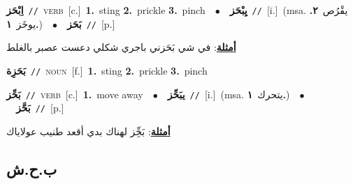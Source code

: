\documentclass[10pt,a4paper,twoside]{article} %
\begin{document}
\begin{multicols}{2}
{{{{{{{{{{{\setlength\topsep{0pt}\textbf{\foreignlanguage{arabic}{اِبْحَز}}\ {\color{gray}\texttt{//}\color{black}}\ \textsc{verb}\ [c.]\ \textbf{1.}~sting  \textbf{2.}~prickle  \textbf{3.}~pinch\ \ $\bullet$\ \ \setlength\topsep{0pt}\textbf{\foreignlanguage{arabic}{يِبْحَز}}\ {\color{gray}\texttt{//}\color{black}}\ [i.]\ \color{gray}(msa. \foreignlanguage{arabic}{يقْرُص}~\foreignlanguage{arabic}{\textbf{٢.}}  \foreignlanguage{arabic}{يوخَز}~\foreignlanguage{arabic}{\textbf{١.}})\color{black}\ \ $\bullet$\ \ \setlength\topsep{0pt}\textbf{\foreignlanguage{arabic}{بَحَز}}\ {\color{gray}\texttt{//}\color{black}}\ [p.]\  \begin{flushright}\color{gray}\foreignlanguage{arabic}{\textbf{\underline{\foreignlanguage{arabic}{أمثلة}}}: في شي بَحَزني باجري شكلي دعست عصبر بالغلط}\end{flushright}\color{black}} \vspace{2mm}

{\setlength\topsep{0pt}\textbf{\foreignlanguage{arabic}{بَحَزِة}}\ {\color{gray}\texttt{//}\color{black}}\ \textsc{noun}\ [f.]\ \textbf{1.}~sting  \textbf{2.}~prickle  \textbf{3.}~pinch\ 

{\setlength\topsep{0pt}\textbf{\foreignlanguage{arabic}{بَحِّز}}\ {\color{gray}\texttt{//}\color{black}}\ \textsc{verb}\ [c.]\ \textbf{1.}~move away\ \ $\bullet$\ \ \setlength\topsep{0pt}\textbf{\foreignlanguage{arabic}{يبَحِّز}}\ {\color{gray}\texttt{//}\color{black}}\ [i.]\ \color{gray}(msa. \foreignlanguage{arabic}{يتحرك}~\foreignlanguage{arabic}{\textbf{١.}})\color{black}\ \ $\bullet$\ \ \setlength\topsep{0pt}\textbf{\foreignlanguage{arabic}{بَحَّز}}\ {\color{gray}\texttt{//}\color{black}}\ [p.]\  \begin{flushright}\color{gray}\foreignlanguage{arabic}{\textbf{\underline{\foreignlanguage{arabic}{أمثلة}}}: بَحِِّز لهناك بدي أقعد طنيب عولاياك}\end{flushright}\color{black}} \vspace{2mm}

\vspace{-3mm}
\subsection*{\color{blue}\foreignlanguage{arabic}{ب.ح.ش}\color{blue}{}} 

}}}}}}}}}}}
\end{multicols}
\end{document}
